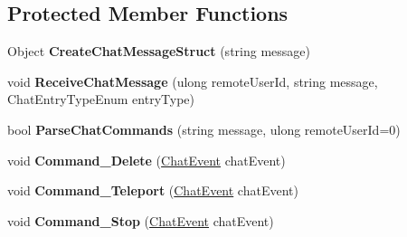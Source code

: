 \subsection*{Protected Member Functions}
\begin{DoxyCompactItemize}
\item 
\hypertarget{class_s_e_mod_a_p_i_extensions_1_1_a_p_i_1_1_chat_manager_a111d606a5653057afce66d3956ca4b55}{}Object {\bfseries Create\+Chat\+Message\+Struct} (string message)\label{class_s_e_mod_a_p_i_extensions_1_1_a_p_i_1_1_chat_manager_a111d606a5653057afce66d3956ca4b55}

\item 
\hypertarget{class_s_e_mod_a_p_i_extensions_1_1_a_p_i_1_1_chat_manager_a6cf6a198738238d81b677f98d571e8c1}{}void {\bfseries Receive\+Chat\+Message} (ulong remote\+User\+Id, string message, Chat\+Entry\+Type\+Enum entry\+Type)\label{class_s_e_mod_a_p_i_extensions_1_1_a_p_i_1_1_chat_manager_a6cf6a198738238d81b677f98d571e8c1}

\item 
\hypertarget{class_s_e_mod_a_p_i_extensions_1_1_a_p_i_1_1_chat_manager_a519751197b3d8b6e0a93acba41de009c}{}bool {\bfseries Parse\+Chat\+Commands} (string message, ulong remote\+User\+Id=0)\label{class_s_e_mod_a_p_i_extensions_1_1_a_p_i_1_1_chat_manager_a519751197b3d8b6e0a93acba41de009c}

\item 
\hypertarget{class_s_e_mod_a_p_i_extensions_1_1_a_p_i_1_1_chat_manager_ad6e44b8007f77416ebdddb5e6dfc79b8}{}void {\bfseries Command\+\_\+\+Delete} (\hyperlink{struct_s_e_mod_a_p_i_extensions_1_1_a_p_i_1_1_chat_manager_1_1_chat_event}{Chat\+Event} chat\+Event)\label{class_s_e_mod_a_p_i_extensions_1_1_a_p_i_1_1_chat_manager_ad6e44b8007f77416ebdddb5e6dfc79b8}

\item 
\hypertarget{class_s_e_mod_a_p_i_extensions_1_1_a_p_i_1_1_chat_manager_a48bf11e9a24bec9753e21db859453cb9}{}void {\bfseries Command\+\_\+\+Teleport} (\hyperlink{struct_s_e_mod_a_p_i_extensions_1_1_a_p_i_1_1_chat_manager_1_1_chat_event}{Chat\+Event} chat\+Event)\label{class_s_e_mod_a_p_i_extensions_1_1_a_p_i_1_1_chat_manager_a48bf11e9a24bec9753e21db859453cb9}

\item 
\hypertarget{class_s_e_mod_a_p_i_extensions_1_1_a_p_i_1_1_chat_manager_af775203c1392e9402dba87a9eb09f405}{}void {\bfseries Command\+\_\+\+Stop} (\hyperlink{struct_s_e_mod_a_p_i_extensions_1_1_a_p_i_1_1_chat_manager_1_1_chat_event}{Chat\+Event} chat\+Event)\label{class_s_e_mod_a_p_i_extensions_1_1_a_p_i_1_1_chat_manager_af775203c1392e9402dba87a9eb09f405}


\end{DoxyCompactItemize}

